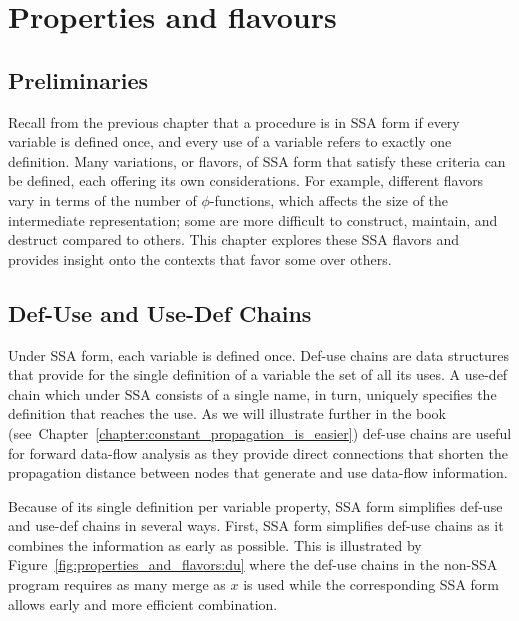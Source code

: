 \chapter{Properties and flavours }
\label{chapter:properties_and_flavours}
\graphicspath{{Figs/}{properties_and_flavours/Figs/}{part1/properties_and_flavours/Figs/}{./}{properties_and_flavours/}{part1/properties_and_flavours/}}


\section{Preliminaries}

Recall from the previous chapter that a procedure is in SSA form if
every variable is defined once, and every use of a variable refers
to exactly one definition. Many variations, or flavors, of SSA form that 
satisfy these criteria can be defined, each offering its own considerations.
For example, different flavors vary in terms of the number of $\phi$-functions,
which affects the size of the intermediate representation; some are more difficult to construct, maintain, and destruct
compared to others. This chapter explores these SSA flavors and provides
insight onto the contexts that favor some over others. 

\section{Def-Use and Use-Def Chains}
\label{sec:properties_and_flavours:def-use}
Under SSA form, each variable is defined once. Def-use chains are data structures that provide for the single definition of a variable the set of all its uses. A use-def chain which under SSA consists of a single name, in turn, uniquely specifies the definition that reaches the use. As we will illustrate further in the book (see~Chapter~\ref{chapter:constant_propagation_is_easier}) def-use chains are useful for forward data-flow analysis as they provide direct connections that shorten the propagation distance between nodes that generate and use data-flow information. 

Because of its single definition per variable property, SSA form simplifies def-use and use-def chains in several ways. First, SSA form simplifies def-use chains as it combines the information as early as possible.
This is illustrated by Figure~\ref{fig:properties_and_flavors:du} where the def-use chains in the non-SSA program requires as many merge as $x$ is used while the corresponding SSA form allows early and more efficient combination. 


